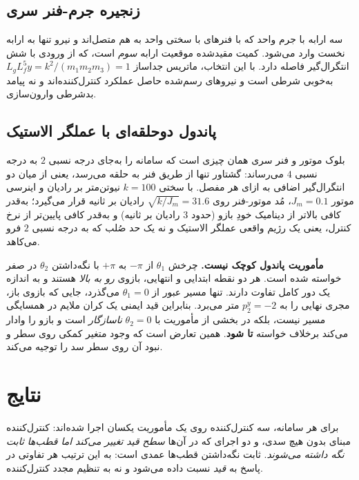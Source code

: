 \documentclass[10pt,twocolumn]{article}
\newcommand{\en}[1]{\lr{#1}}
\begin{document}
\subsection{زنجیره جرم-فنر سری}
سه ارابه با جرم واحد که با فنرهای با سختی واحد به هم متصل‌اند و نیرو تنها به
ارابه نخست وارد می‌شود. کمیت مقیدشده موقعیت ارابه \emph{سوم} است، که از ورودی
با شش انتگرال‌گیر فاصله دارد. با این انتخاب، ماتریس جداساز
$L_g L_f^{5} y = k^{2}/(m_1 m_2 m_3) = 1$ به‌خوبی شرطی است و نیروهای رسم‌شده
حاصل عملکرد کنترل‌کننده‌اند و نه پیامد بدشرطی وارون‌سازی.

\subsection{پاندول دوحلقه‌ای با عملگر الاستیک}
بلوک موتور و فنر سری همان چیزی است که سامانه را به‌جای درجه نسبی $2$ به درجه
نسبی $4$ می‌رساند: گشتاور تنها از طریق فنر به حلقه می‌رسد، یعنی از میان دو
انتگرال‌گیر اضافی به ازای هر مفصل. با سختی $k=100$ نیوتن‌متر بر رادیان و اینرسی
موتور $J_m=0.1$، مُد موتور-فنر روی $\sqrt{k/J_m}=31.6$ رادیان بر ثانیه قرار
می‌گیرد؛ به‌قدر کافی بالاتر از دینامیک خودِ بازو (حدود $3$ رادیان بر ثانیه) و
به‌قدر کافی پایین‌تر از نرخ کنترل، یعنی یک رژیم واقعی عملگر الاستیک و نه یک حد
صُلب که به درجه نسبی $2$ فرو می‌کاهد.

\textbf{مأموریت پاندول کوچک نیست.} چرخش $\theta_1$ از $-\pi$ به $+\pi$ با
نگه‌داشتن $\theta_2$ در صفر خواسته شده است. هر دو نقطه ابتدایی و انتهایی، بازوی
\emph{رو به بالا} هستند و به اندازه یک دور کامل تفاوت دارند. تنها مسیر عبور از
$\theta_1=0$ می‌گذرد، جایی که بازوی باز، مجری نهایی را به $p_2^{y}=-2$ متر
می‌برد. بنابراین قید ایمنی یک کران ملایم در همسایگی مسیر نیست، بلکه در بخشی از
مأموریت با $\theta_2=0$ \emph{ناسازگار} است و بازو را وادار می‌کند برخلاف
خواسته \en{CLF} \textbf{تا شود}. همین تعارض است که وجود متغیر کمکی روی سطر
\en{CLF} و نبود آن روی سطر سد را توجیه می‌کند.

\section{نتایج}
برای هر سامانه، سه کنترل‌کننده روی یک مأموریت یکسان اجرا شده‌اند: کنترل‌کننده
مبنای \en{CLF-QP} بدون هیچ سدی، و دو اجرای \en{ECBF-CLF-QP} که در آن‌ها
\emph{سطح قید تغییر می‌کند اما قطب‌ها ثابت نگه داشته می‌شوند}. ثابت نگه‌داشتن
قطب‌ها عمدی است: به این ترتیب هر تفاوتی در پاسخ به \emph{قید} نسبت داده می‌شود
و نه به تنظیم مجدد کنترل‌کننده.
\end{document}
